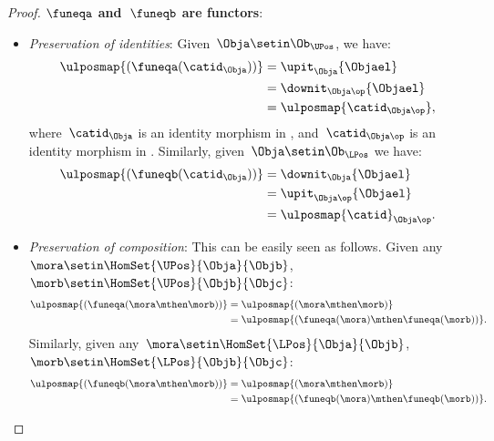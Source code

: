 \begin{proof}
    \textbf{$\funeqa$ and~$\funeqb$ are functors}:
    \begin{itemize}
        \item \emph{Preservation of identities}: Given~$\Obja\setin \Ob_{\UPos}$, we have:
              \begin{equation*}
                  \begin{aligned}
                      \ulposmap{(\funeqa(\catid_\Obja))} & =\upit_\Obja\{\Objael\} \\
                                                         & =\downit_{\Obja\op}\{\Objael\} \\
                                                         & =\ulposmap{\catid_{\Obja\op}},
                  \end{aligned}
              \end{equation*}
              where~$\catid_\Obja$ is an identity morphism in \UPos, and~$\catid_{\Obja\op}$ is an identity morphism in \LPos.
              Similarly, given~$\Obja\setin \Ob_{\LPos}$ we have:
              \begin{equation*}
                  \begin{aligned}
                      \ulposmap{(\funeqb(\catid_\Obja))} & =\downit_\Obja\{\Objael\} \\
                                                         & =\upit_{\Obja\op}\{\Objael\} \\
                                                         & =\ulposmap{\catid}_{\Obja\op}.
                  \end{aligned}
              \end{equation*}
        \item \emph{Preservation of composition}: This can be easily seen as follows.
              Given any~$\mora\setin \HomSet{\UPos}{\Obja}{\Objb}$,~$\morb\setin \HomSet{\UPos}{\Objb}{\Objc}$:
              \begin{equation*}
                  \begin{aligned}
                      \ulposmap{(\funeqa(\mora \mthen \morb))} & =\ulposmap{(\mora\mthen \morb)} \\
                                                               & =\ulposmap{(\funeqa(\mora)\mthen \funeqa(\morb))}.
                  \end{aligned}
              \end{equation*}
              Similarly, given any~$\mora\setin \HomSet{\LPos}{\Obja}{\Objb}$,~$\morb\setin \HomSet{\LPos}{\Objb}{\Objc}$:
              \begin{equation*}
                  \begin{aligned}
                      \ulposmap{(\funeqb(\mora \mthen \morb))} & =\ulposmap{(\mora \mthen \morb)} \\
                                                               & =\ulposmap{(\funeqb(\mora)\mthen \funeqb(\morb))}.
                  \end{aligned}
              \end{equation*}
    \end{itemize}


\end{proof}
